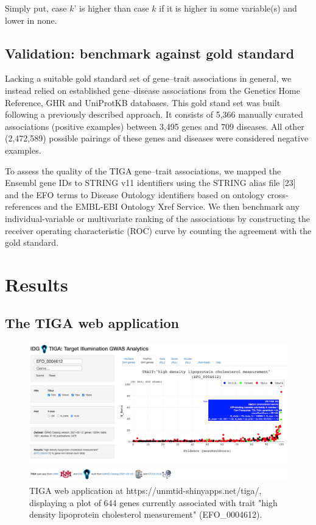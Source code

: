 Simply put, case $k$’ is higher than case $k$ if it is higher in some variable(s) and lower in none.

\subsection{Validation: benchmark against gold standard}

Lacking a suitable gold standard set of gene–trait associations in general, we instead relied on established gene–disease associations from the Genetics Home Reference, GHR\cite{Fomous2006-wm} and UniProtKB\cite{UniProt_Consortium2018-kq} databases. This gold stand set was built following a previously described approach\cite{Pletscher-Frankild2015-oo}. It consists of 5,366 manually curated associations (positive examples) between 3,495 genes and 709 diseases. All other (2,472,589) possible pairings of these genes and diseases were considered negative examples.

To assess the quality of the TIGA gene–trait associations, we mapped the Ensembl gene IDs to STRING v11 identifiers using the STRING alias file [23] and the EFO terms to Disease Ontology\cite{Schriml2019-uh} identifiers based on ontology cross-references and the EMBL-EBI Ontology Xref Service. We then benchmark any individual-variable or multivariate ranking of the associations by constructing the receiver operating characteristic (ROC) curve by counting the agreement with the gold standard.

\section{Results}

\subsection{The TIGA web application}

\begin{figure}
	\includegraphics[width=\textwidth]{figures/tiga/FIG03_TIGA_EFO_0004612_plot.png}
	\caption{TIGA web application at https://unmtid-shinyapps.net/tiga/, displaying a plot of 644 genes currently associated with trait "high density lipoprotein cholesterol measurement" (EFO\_0004612).}
	\label{fig:TIGA_app}
\end{figure}

